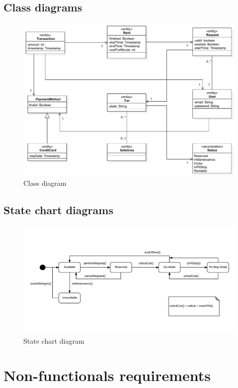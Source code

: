 \subsection{Class diagrams}
\begin{figure}[H]
\centering
\includegraphics[width=\textwidth, keepaspectratio]{../images/diagram/class/class_diagram.pdf}
\caption{Class diagram}
\end{figure}

\subsection{State chart diagrams}
\begin{figure}[H]
\centering
\includegraphics[width=\textwidth, keepaspectratio]{../images/diagram/state_chart/car_status.pdf}
\caption{State chart diagram}
\end{figure}

\clearpage
\section{Non-functionals requirements}

